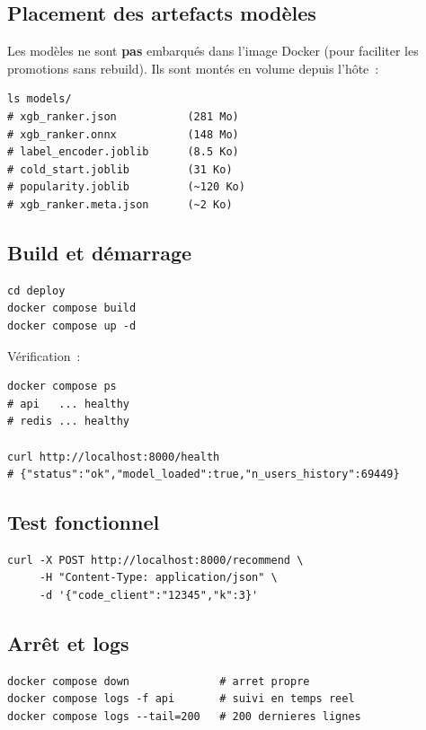 \documentclass[12pt, a4paper]{report}
\begin{document}
\subsection{Placement des artefacts modèles}

Les modèles ne sont \textbf{pas} embarqués dans l'image Docker (pour
faciliter les promotions sans rebuild). Ils sont montés en volume depuis
l'hôte~:

\begin{lstlisting}[style=bash]
ls models/
# xgb_ranker.json           (281 Mo)
# xgb_ranker.onnx           (148 Mo)
# label_encoder.joblib      (8.5 Ko)
# cold_start.joblib         (31 Ko)
# popularity.joblib         (~120 Ko)
# xgb_ranker.meta.json      (~2 Ko)
\end{lstlisting}

\subsection{Build et démarrage}

\begin{lstlisting}[style=bash]
cd deploy
docker compose build
docker compose up -d
\end{lstlisting}

Vérification~:
\begin{lstlisting}[style=bash]
docker compose ps
# api   ... healthy
# redis ... healthy

curl http://localhost:8000/health
# {"status":"ok","model_loaded":true,"n_users_history":69449}
\end{lstlisting}

\subsection{Test fonctionnel}

\begin{lstlisting}[style=bash]
curl -X POST http://localhost:8000/recommend \
     -H "Content-Type: application/json" \
     -d '{"code_client":"12345","k":3}'
\end{lstlisting}

\subsection{Arrêt et logs}

\begin{lstlisting}[style=bash]
docker compose down              # arret propre
docker compose logs -f api       # suivi en temps reel
docker compose logs --tail=200   # 200 dernieres lignes
\end{lstlisting}
\end{document}
